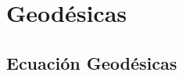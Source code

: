 \chapter{Geodésicas}\label{Capítulo: Geodésicas}
\lipsum[1-2]

\section{Ecuación Geodésicas}
\lipsum[1]
